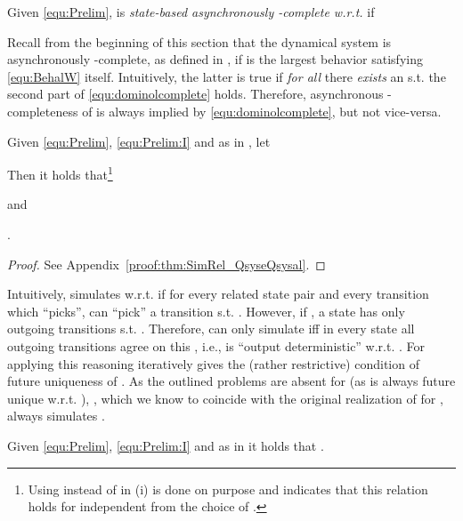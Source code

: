 \begin{definition}\label{def:SBalc}
Given \eqref{equ:Prelim},  is \emph{state-based asynchronously -complete w.r.t. } if
 
\end{definition}

\begin{remark}\label{rem:SBalc}
Recall from the beginning of this section that the dynamical system  is asynchronously -complete, as  defined in \cite[Def.6]{SchmuckRaisch2014_ControlLetters}, if  is the largest behavior satisfying \eqref{equ:BehalW} itself. Intuitively, the latter is true if \emph{for all}  there \emph{exists} an  s.t. the second part of \eqref{equ:dominolcomplete} holds. Therefore, asynchronous -completeness of  is always implied by \eqref{equ:dominolcomplete}, but not vice-versa. 
\end{remark}

\begin{theorem}\label{thm:SimRel_QsyseQsysal}
Given \eqref{equ:Prelim}, \eqref{equ:Prelim:I} and  as in , let

Then it holds that\footnote{Using  instead of  in (i) is done on purpose and indicates that this relation holds for  independent from the choice of .} 
\begin{compactenum}[(i)]
 \item \Qsyse\Ilm and
 \item \Qsysel\Ilm.
\end{compactenum}
\end{theorem}

\begin{proof}
See Appendix~\ref{proof:thm:SimRel_QsyseQsysal}. \end{proof}

Intuitively,  simulates  w.r.t.  if for every related state pair  and every transition  which  \enquote{picks},  can \enquote{pick} a transition  s.t. . However, if , a state  has only outgoing transitions s.t. . Therefore,  can only simulate  iff in every state  all outgoing transitions agree on this , i.e.,  is \enquote{output deterministic} w.r.t. . For  applying this reasoning iteratively gives the (rather restrictive) condition of future uniqueness of .
As the outlined problems are absent for  (as  is always future unique w.r.t. ), , which we know to coincide with the original realization  of \SAlA for , always simulates .

\begin{corollary}
 Given \eqref{equ:Prelim}, \eqref{equ:Prelim:I} and  as in  it holds that 
.
\end{corollary}

